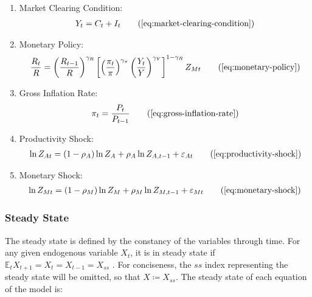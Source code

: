 \documentclass[
thesis.tex
]{subfiles}
\begin{document}
{\begin{itemize}
\begin{enumerate}
				\item Market Clearing Condition:
				\begin{align}
					Y_t = C_t + I_t
					\tag{\ref{eq:market-clearing-condition}}
				\end{align}
				
				\item Monetary Policy:
				\begin{align}
					\frac{R_t}{R} = \left( 
					\frac{R_{t-1}}{R} \right)^{\gamma_R} \left[ \left(
					\frac{\pi_t}{\pi} \right)^{\gamma_\pi} \left( 
					\frac{Y_t}{Y} \right)^{\gamma_Y} \right]^{1-\gamma_R} Z_{Mt}
					\tag{\ref{eq:monetary-policy}}
				\end{align}
				
				\item Gross Inflation Rate:
				\begin{align}
					\pi_t = \frac{P_t}{P_{t-1}}
					\tag{\ref{eq:gross-inflation-rate}}
				\end{align}
				
				\item Productivity Shock:
				\begin{align}
					\ln{Z_{At}} = (1-\rho_A)\ln{Z_A} + \rho_A\ln{Z_{A,t-1}} + \varepsilon_{At}
					\tag{\ref{eq:productivity-shock}}
				\end{align}
				
				\item Monetary Shock:
				\begin{align}
					\ln{Z_{Mt}} = (1-\rho_M)\ln{Z_{M}} + \rho_M\ln{Z_{M,t-1}} + \varepsilon_{Mt}
					\tag{\ref{eq:monetary-shock}}
				\end{align}
				
			\end{enumerate}
			
		\end{itemize}
		
	} %
	
	
	
	\subsubsection{Steady State}
	
	The steady state is defined by the constancy of the variables through time. For any given endogenous variable $X_t$, it is in steady state if $\mathbb{E}_t X_{t+1} = X_t = X_{t-1} = X_{ss}$ \cite[p.41]{costa_junior_understanding_2016}. For conciseness, the $ss$ index representing the steady state will be omitted, so that $X \coloneq X_{ss}$. The steady state of each equation of the model is:
	
\end{document}
